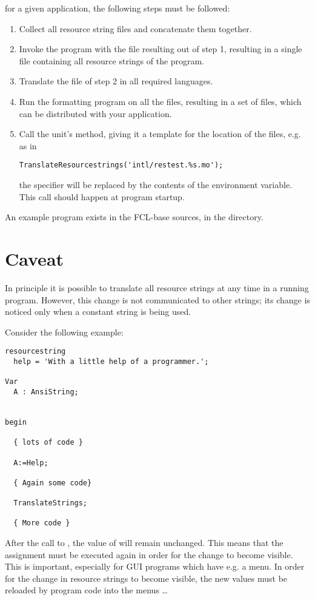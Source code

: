 for a given application, the following steps must be followed:
\begin{enumerate}
\item Collect all resource string files and concatenate them together.
\item Invoke the  program with the file resulting out of step
1, resulting in a single  file containing all resource strings of
the program.
\item Translate the  file of step 2 in all required languages.
\item Run the  formatting program on all the  files,
resulting in a set of  files, which can be distributed with your
application.
\item Call the  unit's  method,
giving it a template for the location of the  files, e.g. as in
\begin{verbatim}
TranslateResourcestrings('intl/restest.%s.mo');
\end{verbatim}
the  specifier will be replaced by the contents of the 
environment variable. This call should happen at program startup.
\end{enumerate}
An example program exists in the FCL-base sources, in the 
directory.
\section{Caveat}
In principle it is possible to translate all resource strings at any time in
a running program. However, this change is not communicated to other
strings; its change is noticed only when a constant string is being used.

Consider the following example:
\begin{verbatim}
resourcestring
  help = 'With a little help of a programmer.';

Var
  A : AnsiString;


begin

  { lots of code }

  A:=Help;

  { Again some code}

  TranslateStrings;

  { More code }
\end{verbatim}
After the call to , the value of  will remain
unchanged. This means that the assignment  must be executed
again in order for the change to become visible. This is important,
especially for GUI programs which have e.g. a menu. In order for the
change in resource strings to become visible, the new values must be
reloaded by program code into the menus \dots

